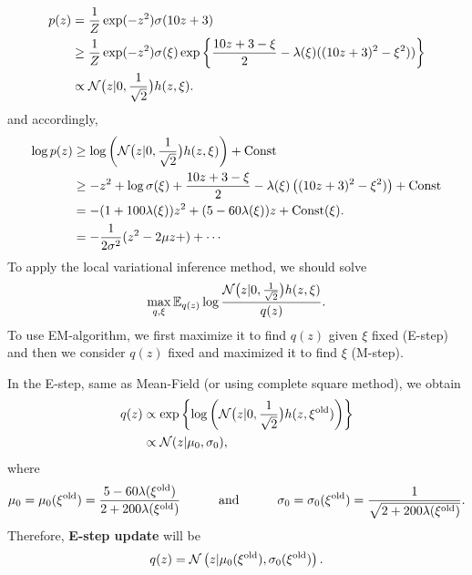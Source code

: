 \documentclass[12pt, fullpage,letterpaper]{article}
\begin{document}
\begin{enumerate}
\begin{enumerate}
{\begin{align*}
p(z) & =\frac{1}{Z}\exp(-z^2)\sigma(10z + 3)\\
& \geq \frac{1}{Z}\exp(-z^2)\sigma(\xi)\exp\left\{\frac{10z+3-\xi}{2}-\lambda(\xi)((10z+3)^2-\xi^2))\right\}\\
& \propto \mathcal{N}\big(z|0,\frac{1}{\sqrt{2}}\big)h(z,\xi).
\end{align*}
and accordingly, 
\begin{align*}
\log p(z) 
&\geq  \log \left(\mathcal{N}\big(z|0,\frac{1}{\sqrt{2}}\big)h(z,\xi)\right) + \text{Const}\\
& \geq -z^2 + \log \sigma(\xi) + \frac{10z+3-\xi}{2}-\lambda(\xi)\left((10z+3)^2-\xi^2)\right) +\text{Const}\\
& = -(1+100\lambda(\xi))z^2 +(5-60\lambda(\xi))z + \text{Const}(\xi).\\
& = -\frac{1}{2\sigma^2}(z^2 - 2\mu z + ) + \cdots  
\end{align*}
To apply the local variational inference method, we should solve 
$$\max\limits_{q,\xi} \mathbb{E}_{q(z)}\log \frac{\mathcal{N}\big(z|0,\frac{1}{\sqrt{2}}\big)h(z,\xi)}{q(z)}.$$
To use EM-algorithm, we first maximize it to find $q(z)$ given $\xi$ fixed (E-step) and then 
we consider $q(z)$ fixed and maximized it to find $\xi$ (M-step).

In the E-step, same as Mean-Field (or using complete square method), we obtain 
\begin{align*}
q(z) 
& \propto \exp\left\{\log \left(\mathcal{N}\big(z|0,\frac{1}{\sqrt{2}}\big)h(z,\xi^{\rm old})\right)\right\}\\
& \propto \mathcal{N}(z|\mu_0,\sigma_0),
\end{align*}
where 
\begin{equation}\label{estep}
\mu_0 = \mu_0(\xi^{\rm old}) = \frac{5-60\lambda(\xi^{\rm old})}{2+200\lambda(\xi^{\rm old})}
\quad\quad\quad \text{and}\quad\quad\quad 
\sigma_0= \sigma_0(\xi^{\rm old}) =\frac{1}{ \sqrt{2+200\lambda(\xi^{\rm old})}}.
\end{equation}
Therefore, {\bf E-step update} will be 
\begin{equation}\label{E_step}
q(z) =  \mathcal{N}\left(z|\mu_0(\xi^{\rm old}),\sigma_0(\xi^{\rm old})\right).
\end{equation}

}
\end{enumerate}
\end{enumerate}
\end{document}
